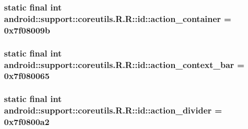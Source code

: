 \hypertarget{classandroid_1_1support_1_1coreutils_1_1_r_1_1id_4d142a6b08f0438c569d0c247439486f}{
\subsubsection[{action\_\-container}]{\setlength{\rightskip}{0pt plus 5cm}static final int android::support::coreutils.R.R::id::action\_\-container = 0x7f08009b}}
\label{classandroid_1_1support_1_1coreutils_1_1_r_1_1id_4d142a6b08f0438c569d0c247439486f}


\hypertarget{classandroid_1_1support_1_1coreutils_1_1_r_1_1id_846247fbe75a254504f2479e2c5e0e43}{
\subsubsection[{action\_\-context\_\-bar}]{\setlength{\rightskip}{0pt plus 5cm}static final int android::support::coreutils.R.R::id::action\_\-context\_\-bar = 0x7f080065}}
\label{classandroid_1_1support_1_1coreutils_1_1_r_1_1id_846247fbe75a254504f2479e2c5e0e43}


\hypertarget{classandroid_1_1support_1_1coreutils_1_1_r_1_1id_7852fedc6f5ded363a75c633ec462ffe}{
\subsubsection[{action\_\-divider}]{\setlength{\rightskip}{0pt plus 5cm}static final int android::support::coreutils.R.R::id::action\_\-divider = 0x7f0800a2}}
\label{classandroid_1_1support_1_1coreutils_1_1_r_1_1id_7852fedc6f5ded363a75c633ec462ffe}


